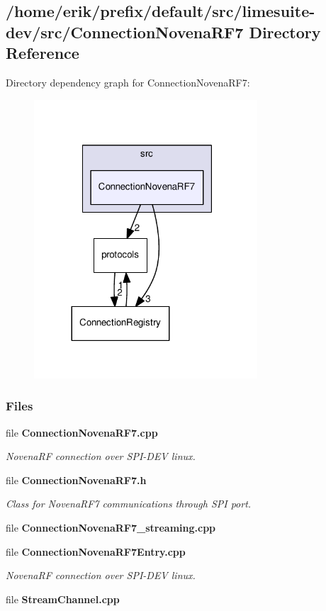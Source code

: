 \subsection{/home/erik/prefix/default/src/limesuite-\/dev/src/\+Connection\+Novena\+R\+F7 Directory Reference}
\label{dir_1438321e5cfda2808bb8a935fccb86d0}
Directory dependency graph for Connection\+Novena\+R\+F7\+:
\nopagebreak
\begin{figure}[H]
\begin{center}
\leavevmode
\includegraphics[width=236pt]{dir_1438321e5cfda2808bb8a935fccb86d0_dep}
\end{center}
\end{figure}
\subsubsection*{Files}
\begin{DoxyCompactItemize}
\item 
file {\bf Connection\+Novena\+R\+F7.\+cpp}
\begin{DoxyCompactList}\small\item\em Novena\+RF connection over S\+P\+I-\/\+D\+EV linux. \end{DoxyCompactList}\item 
file {\bf Connection\+Novena\+R\+F7.\+h}
\begin{DoxyCompactList}\small\item\em Class for Novena\+R\+F7 communications through S\+PI port. \end{DoxyCompactList}\item 
file {\bf Connection\+Novena\+R\+F7\+\_\+streaming.\+cpp}
\item 
file {\bf Connection\+Novena\+R\+F7\+Entry.\+cpp}
\begin{DoxyCompactList}\small\item\em Novena\+RF connection over S\+P\+I-\/\+D\+EV linux. \end{DoxyCompactList}\item 
file {\bf Stream\+Channel.\+cpp}
\end{DoxyCompactItemize}
